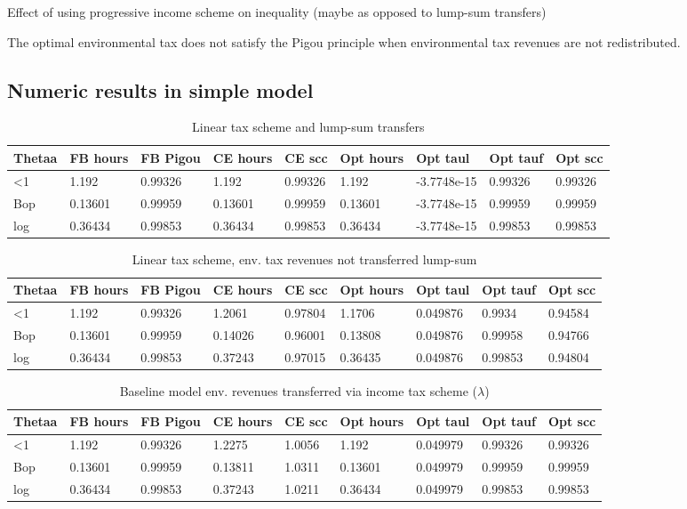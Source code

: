 \begin{prop}
Effect of using progressive income scheme on inequality (maybe as opposed to lump-sum transfers)
\end{prop}

\begin{prop}
	The optimal environmental tax does not satisfy the Pigou principle when environmental tax revenues are not redistributed. 
\end{prop}

\subsection{Numeric results in simple model}
\begin{table}[h!!]
	\caption{Linear tax scheme and lump-sum transfers}\label{tab:lin_lst}
	\begin{tabular}{lllllllll}
		Thetaa & FB hours & FB Pigou & CE hours & CE scc & Opt hours & Opt taul & Opt tauf & Opt scc \\ 
		\hline 
		<1 & 1.192 & 0.99326 & 1.192 & 0.99326 & 1.192 & -3.7748e-15 & 0.99326 & 0.99326 \\ 
		Bop & 0.13601 & 0.99959 & 0.13601 & 0.99959 & 0.13601 & -3.7748e-15 & 0.99959 & 0.99959 \\ 
		log & 0.36434 & 0.99853 & 0.36434 & 0.99853 & 0.36434 & -3.7748e-15 & 0.99853 & 0.99853 \\ 
		\hline 
	\end{tabular}
\end{table}
\begin{table}
	\caption{Linear tax scheme, env. tax revenues not transferred lump-sum}\label{tab:lin_nolst}
	\begin{tabular}{lllllllll}
		Thetaa & FB hours & FB Pigou & CE hours & CE scc & Opt hours & Opt taul & Opt tauf & Opt scc \\ 
		\hline 
		<1 & 1.192 & 0.99326 & 1.2061 & 0.97804 & 1.1706 & 0.049876 & 0.9934 & 0.94584 \\ 
		Bop & 0.13601 & 0.99959 & 0.14026 & 0.96001 & 0.13808 & 0.049876 & 0.99958 & 0.94766 \\ 
		log & 0.36434 & 0.99853 & 0.37243 & 0.97015 & 0.36435 & 0.049876 & 0.99853 & 0.94804 \\ 
		\hline 
	\end{tabular}
\end{table}
\begin{table}[h!!]
	\caption{Baseline model env. revenues transferred via income tax scheme ($\lambda$)}\label{tab:base}
	\begin{tabular}{lllllllll}
		Thetaa & FB hours & FB Pigou & CE hours & CE scc & Opt hours & Opt taul & Opt tauf & Opt scc \\ 
		\hline 
		<1 & 1.192 & 0.99326 & 1.2275 & 1.0056 & 1.192 & 0.049979 & 0.99326 & 0.99326 \\ 
		Bop & 0.13601 & 0.99959 & 0.13811 & 1.0311 & 0.13601 & 0.049979 & 0.99959 & 0.99959 \\ 
		log & 0.36434 & 0.99853 & 0.37243 & 1.0211 & 0.36434 & 0.049979 & 0.99853 & 0.99853 \\ 
		\hline 
	\end{tabular}
\end{table}
